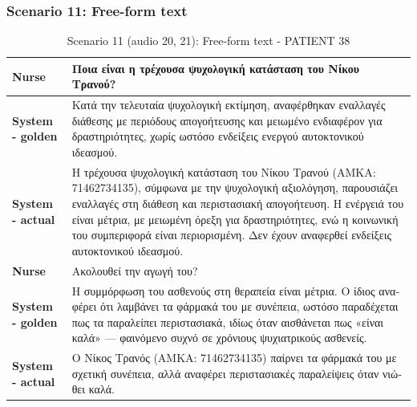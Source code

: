 \subsubsection{Scenario 11: Free-form text}
\begin{table}[H]
\centering
\renewcommand{\arraystretch}{1.5} 
\begin{tabular}{|>{\bfseries}l|p{11cm}|}
\hline
Nurse & \textgreek{Ποια είναι η τρέχουσα ψυχολογική κατάσταση του Νίκου Τρανού?} \\
\hline
System - golden & \textgreek{Κατά την τελευταία ψυχολογική εκτίμηση, αναφέρθηκαν εναλλαγές διάθεσης με περιόδους απογοήτευσης και μειωμένο ενδιαφέρον για δραστηριότητες, χωρίς ωστόσο ενδείξεις ενεργού αυτοκτονικού ιδεασμού.} \\
\hline
System - actual & \textgreek{Η τρέχουσα ψυχολογική κατάσταση του Νίκου Τρανού (ΑΜΚΑ: 71462734135), σύμφωνα με την ψυχολογική αξιολόγηση, παρουσιάζει εναλλαγές στη διάθεση και περιστασιακή απογοήτευση. Η ενέργειά του είναι μέτρια, με μειωμένη όρεξη για δραστηριότητες, ενώ η κοινωνική του συμπεριφορά είναι περιορισμένη. Δεν έχουν αναφερθεί ενδείξεις αυτοκτονικού ιδεασμού.} \\
\hline
Nurse & \textgreek{Ακολουθεί την αγωγή του?} \\
\hline
System - golden & \textgreek{Η συμμόρφωση του ασθενούς στη θεραπεία είναι μέτρια. Ο ίδιος αναφέρει ότι λαμβάνει τα φάρμακά του με συνέπεια, ωστόσο παραδέχεται πως τα παραλείπει περιστασιακά, ιδίως όταν αισθάνεται πως «είναι καλά» — φαινόμενο συχνό σε χρόνιους ψυχιατρικούς ασθενείς.} \\
\hline
System - actual & \textgreek{Ο Νίκος Τρανός (ΑΜΚΑ: 71462734135) παίρνει τα φάρμακά του με σχετική συνέπεια, αλλά αναφέρει περιστασιακές παραλείψεις όταν νιώθει καλά.} \\
\hline
\end{tabular}
\caption{Scenario 11 (audio 20, 21): Free-form text - PATIENT 38}
\end{table}

